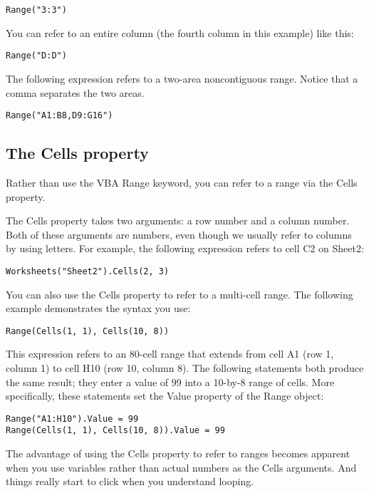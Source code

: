\documentclass[
]{article}
\theoremstyle{definition}
\theoremstyle{definition}
\theoremstyle{definition}
\theoremstyle{definition}
\theoremstyle{remark}
\begin{document}
\begin{verbatim}
Range("3:3")
\end{verbatim}

You can refer to an entire column (the fourth column in this example) like this:

\begin{verbatim}
Range("D:D")
\end{verbatim}

The following expression refers to a two-area noncontiguous range. Notice that a comma separates the two areas.

\begin{verbatim}
Range("A1:B8,D9:G16")
\end{verbatim}

\hypertarget{the-cells-property}{%
\subsection{The Cells property}\label{the-cells-property}}

Rather than use the VBA Range keyword, you can refer to a range via the Cells property.

The Cells property takes two arguments: a row number and a column number. Both of these arguments are numbers, even though we usually refer to columns by using letters. For example, the following expression
refers to cell C2 on Sheet2:

\begin{verbatim}
Worksheets("Sheet2").Cells(2, 3)
\end{verbatim}

You can also use the Cells property to refer to a multi-cell range. The following example demonstrates the syntax you use:

\begin{verbatim}
Range(Cells(1, 1), Cells(10, 8))
\end{verbatim}

This expression refers to an 80-cell range that extends from cell A1 (row 1, column 1) to cell H10 (row 10, column 8). The following statements both produce the same result; they enter a value of 99 into a 10-by-8 range of cells. More specifically, these statements set the Value property of the Range object:

\begin{verbatim}
Range("A1:H10").Value = 99
Range(Cells(1, 1), Cells(10, 8)).Value = 99
\end{verbatim}

The advantage of using the Cells property to refer to ranges becomes apparent when you use variables rather than actual numbers as the Cells arguments. And things really start to click when you understand looping.
\end{document}
